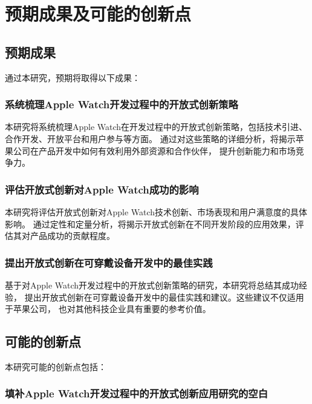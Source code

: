 
\chapter{预期成果及可能的创新点}

\section{预期成果}

通过本研究，预期将取得以下成果：

\subsection{系统梳理Apple Watch开发过程中的开放式创新策略}

本研究将系统梳理Apple Watch在开发过程中的开放式创新策略，包括技术引进、合作开发、开放平台和用户参与等方面。
通过对这些策略的详细分析，将揭示苹果公司在产品开发中如何有效利用外部资源和合作伙伴，
提升创新能力和市场竞争力\citep{apple2024, davidson_assessing_2023,dahlander_how_2010}。

\subsection{评估开放式创新对Apple Watch成功的影响}

本研究将评估开放式创新对Apple Watch技术创新、市场表现和用户满意度的具体影响。
通过定性和定量分析，将揭示开放式创新在不同开发阶段的应用效果，评估其对产品成功的贡献程度\citep{gehani2016corporate,chesbrough_beyond_2006}。

\subsection{提出开放式创新在可穿戴设备开发中的最佳实践}

基于对Apple Watch开发过程中的开放式创新策略的研究，本研究将总结其成功经验，
提出开放式创新在可穿戴设备开发中的最佳实践和建议。这些建议不仅适用于苹果公司，
也对其他科技企业具有重要的参考价值\citep{chesbrough2016}。

\section{可能的创新点}

本研究可能的创新点包括：

\subsection{填补Apple Watch开发过程中的开放式创新应用研究的空白}

